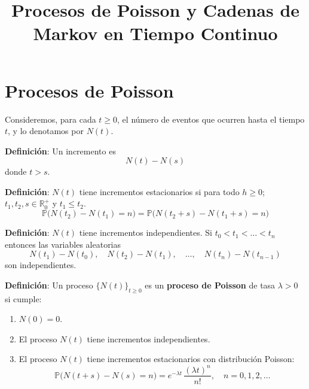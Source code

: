 \documentclass[12pt,a4paper]{article}
\title{Procesos de Poisson y Cadenas de Markov en Tiempo Continuo}
\author{}
\date{}
\newcommand{\definicion}[1]{%
\begin{definicionbox}
\textbf{Definición}: #1
\end{definicionbox}
}
\begin{document}
\maketitle

\section{Procesos de Poisson}

Consideremos, para cada $t \geq 0$, el número de eventos que ocurren hasta el tiempo $t$, y lo denotamos por $N(t)$.

\definicion{Un incremento es 
\begin{equation*}
N(t) - N(s)
\end{equation*}
donde $t > s$.}

\definicion{$N(t)$ tiene incrementos estacionarios si para todo $h \geq 0$; $t_1, t_2, s \in \mathbb{R}_{0}^+$ y $t_1 \leq t_{2}$.
\begin{equation*}
\mathbb{P}\big(N(t_{2}) - N(t_{1}) = n\big) 
= \mathbb{P}\big(N(t_{2}+s) - N(t_{1}+s) = n\big)
\end{equation*}}

\begin{center}
\end{center}

\definicion{$N(t)$ tiene incrementos independientes. Si $t_{0} < t_{1} < \dots < t_{n}$ entonces las variables aleatorias
\begin{equation*}
N(t_{1}) - N(t_{0}), \quad 
N(t_{2}) - N(t_{1}), \quad \dots, \quad 
N(t_{n}) - N(t_{n-1})
\end{equation*}
son independientes.}

\definicion{Un proceso $\{N(t)\}_{t \geq 0}$ es un \textbf{proceso de Poisson} de tasa $\lambda > 0$ si cumple:
\begin{enumerate}
    \item $N(0) = 0$.
    \item El proceso $N(t)$ tiene incrementos independientes.
    \item El proceso $N(t)$ tiene incrementos estacionarios con distribución Poisson:
    \begin{equation*}
    \mathbb{P}\big(N(t+s) - N(s) = n\big) 
    = e^{-\lambda t} \, \frac{(\lambda t)^n}{n!}, 
    \quad n = 0,1,2,\dots
    \end{equation*}
\end{enumerate}}
\end{document}
